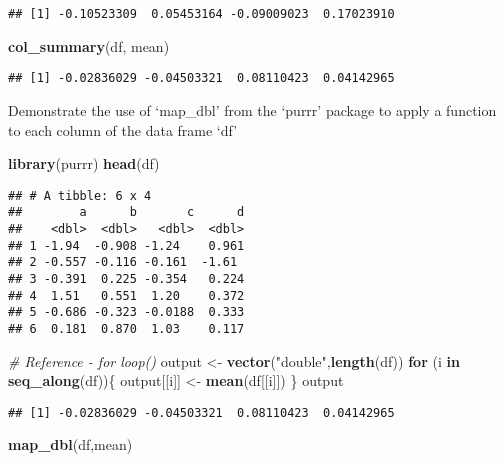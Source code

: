 \documentclass[
]{article}
\newenvironment{Shaded}{\begin{snugshade}}{\end{snugshade}}
\newcommand{\CommentTok}[1]{\textcolor[rgb]{0.56,0.35,0.01}{\textit{#1}}}
\newcommand{\ControlFlowTok}[1]{\textcolor[rgb]{0.13,0.29,0.53}{\textbf{#1}}}
\newcommand{\FunctionTok}[1]{\textcolor[rgb]{0.13,0.29,0.53}{\textbf{#1}}}
\newcommand{\NormalTok}[1]{#1}
\newcommand{\OtherTok}[1]{\textcolor[rgb]{0.56,0.35,0.01}{#1}}
\newcommand{\StringTok}[1]{\textcolor[rgb]{0.31,0.60,0.02}{#1}}
\begin{document}
\begin{verbatim}
## [1] -0.10523309  0.05453164 -0.09009023  0.17023910
\end{verbatim}

\begin{Shaded}
\begin{Highlighting}[]
\FunctionTok{col\_summary}\NormalTok{(df, mean)}
\end{Highlighting}
\end{Shaded}

\begin{verbatim}
## [1] -0.02836029 -0.04503321  0.08110423  0.04142965
\end{verbatim}

Demonstrate the use of `map\_dbl' from the `purrr' package to apply a
function to each column of the data frame `df'

\begin{Shaded}
\begin{Highlighting}[]
\FunctionTok{library}\NormalTok{(purrr)}
\FunctionTok{head}\NormalTok{(df)}
\end{Highlighting}
\end{Shaded}

\begin{verbatim}
## # A tibble: 6 x 4
##        a      b       c      d
##    <dbl>  <dbl>   <dbl>  <dbl>
## 1 -1.94  -0.908 -1.24    0.961
## 2 -0.557 -0.116 -0.161  -1.61 
## 3 -0.391  0.225 -0.354   0.224
## 4  1.51   0.551  1.20    0.372
## 5 -0.686 -0.323 -0.0188  0.333
## 6  0.181  0.870  1.03    0.117
\end{verbatim}

\begin{Shaded}
\begin{Highlighting}[]
\CommentTok{\# Reference {-} for loop()}
\NormalTok{output }\OtherTok{\textless{}{-}} \FunctionTok{vector}\NormalTok{(}\StringTok{"double"}\NormalTok{,}\FunctionTok{length}\NormalTok{(df))}
\ControlFlowTok{for}\NormalTok{ (i }\ControlFlowTok{in} \FunctionTok{seq\_along}\NormalTok{(df))\{}
\NormalTok{  output[[i]] }\OtherTok{\textless{}{-}} \FunctionTok{mean}\NormalTok{(df[[i]])}
\NormalTok{\}}
\NormalTok{output}
\end{Highlighting}
\end{Shaded}

\begin{verbatim}
## [1] -0.02836029 -0.04503321  0.08110423  0.04142965
\end{verbatim}

\begin{Shaded}
\begin{Highlighting}[]
\FunctionTok{map\_dbl}\NormalTok{(df,mean)}
\end{Highlighting}
\end{Shaded}
\end{document}
